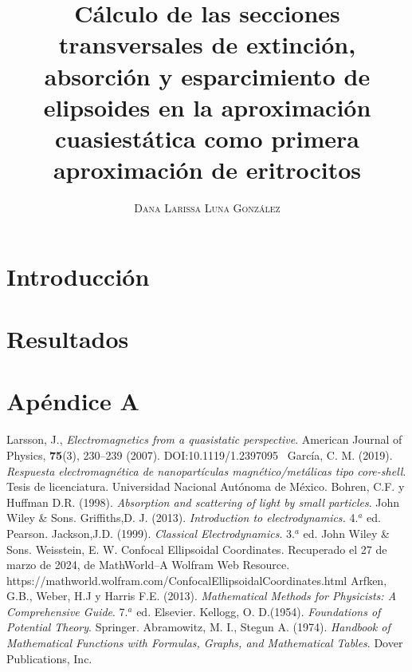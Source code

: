 \documentclass[paper=letter,8.5pt]{article}
\title{\vspace{-15mm}\fontsize{17pt}\selectfont\textbf{Cálculo de las secciones transversales de extinción, absorción y esparcimiento de elipsoides en la aproximación cuasiestática como primera aproximación de eritrocitos }} %
\author{
\large
{\textsc{ Dana Larissa Luna González}}\\[2mm]}
\date{}
\begin{document}
\maketitle %
\thispagestyle{fancy} %
\section{Introducción}




\section{Resultados}



\section{Apéndice A}

















\begin{thebibliography}{99}
 Larsson, J., \textit{Electromagnetics from a quasistatic perspective}. American Journal of Physics, \textbf{75}(3), 230–239 (2007). DOI:10.1119/1.2397095 
 García, C. M. (2019). \textit{Respuesta electromagnética de nanopartículas magnético/metálicas tipo core-shell}. Tesis de licenciatura. Universidad Nacional Autónoma de México.
Bohren, C.F. y  Huffman D.R.  (1998). \textit{Absorption and scattering of light by small particles}. John Wiley \& Sons.
Griffiths,D. J.  (2013). \textit{Introduction to electrodynamics.} 4.$^a$ ed. Pearson.
Jackson,J.D.  (1999). \textit{Classical Electrodynamics}. 3.$^a$ ed.  John Wiley \& Sons.
 Weisstein, E. W. Confocal Ellipsoidal Coordinates. Recuperado el 27 de marzo de 2024, de MathWorld--A Wolfram Web Resource. https://mathworld.wolfram.com/ConfocalEllipsoidalCoordinates.html
 Arfken, G.B., Weber, H.J y Harris F.E. (2013). \textit{Mathematical Methods for Physicists: A Comprehensive Guide}. 7.$^a$ ed. Elsevier.
 Kellogg, O. D.(1954). \textit{Foundations of Potential Theory}. Springer.
 Abramowitz, M. I., Stegun A. (1974). \textit{Handbook of Mathematical Functions with Formulas, Graphs, and
Mathematical Tables}. Dover Publications, Inc.
\end{thebibliography}

\end{document}
